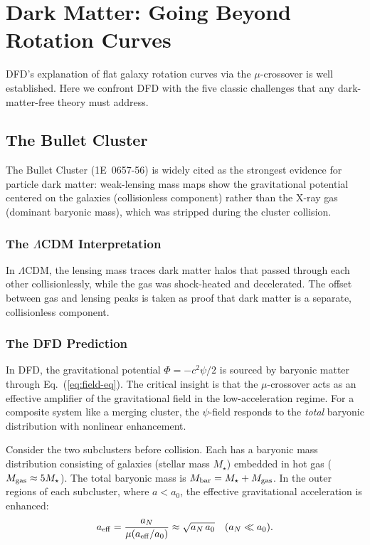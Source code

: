 \documentclass[aps,prd,twocolumn,superscriptaddress,nofootinbib]{revtex4-2}
\begin{document}
\section{Dark Matter: Going Beyond Rotation Curves}\label{sec:dark-matter}

DFD's explanation of flat galaxy rotation curves via the $\mu$-crossover
is well established. Here we confront DFD with the five classic challenges
that any dark-matter-free theory must address.

\subsection{The Bullet Cluster}\label{sec:bullet}

The Bullet Cluster (1E~0657-56) is widely cited as the strongest evidence
for particle dark matter: weak-lensing mass maps show the gravitational
potential centered on the galaxies (collisionless component) rather than
the X-ray gas (dominant baryonic mass), which was stripped during the
cluster collision.

\subsubsection{The $\Lambda$CDM Interpretation}

In $\Lambda$CDM, the lensing mass traces dark matter halos that passed
through each other collisionlessly, while the gas was shock-heated and
decelerated. The offset between gas and lensing peaks is taken as
proof that dark matter is a separate, collisionless component.

\subsubsection{The DFD Prediction}

In DFD, the gravitational potential $\Phi = -c^2\psi/2$ is sourced by
baryonic matter through Eq.~(\ref{eq:field-eq}). The critical insight
is that the $\mu$-crossover acts as an effective amplifier of the
gravitational field in the low-acceleration regime. For a composite
system like a merging cluster, the $\psi$-field responds to the
\textit{total} baryonic distribution with nonlinear enhancement.

Consider the two subclusters before collision. Each has a baryonic
mass distribution consisting of galaxies (stellar mass $M_\star$)
embedded in hot gas ($M_{\rm gas} \approx 5M_\star$). The total
baryonic mass is $M_{\rm bar} = M_\star + M_{\rm gas}$. In the
outer regions of each subcluster, where $a < a_0$, the effective
gravitational acceleration is enhanced:
\begin{equation}
a_{\rm eff} = \frac{a_N}{\mu(a_{\rm eff}/a_0)}
\approx \sqrt{a_N\,a_0} \quad (a_N \ll a_0).
\end{equation}
\end{document}
